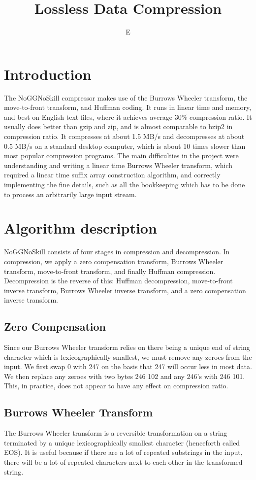 \documentclass[a4paper]{article}
\title{Lossless Data Compression}
\author{E}
\date{}
\begin{document}
\begin{multicols}{2}
\section{Introduction}
The NoGGNoSkill compressor makes use of the Burrows Wheeler transform, the move-to-front transform, and Huffman coding. It runs in linear time and memory, and best on English text files, where it achieves average 30\% compression ratio. It usually does better than gzip and zip, and is almost comparable to bzip2 in compression ratio. It compresses at about 1.5 MB/s and decompresses at about 0.5 MB/s on a standard desktop computer, which is about 10 times slower than most popular compression programs. The main difficulties in the project were understanding and writing a linear time Burrows Wheeler transform, which required a linear time suffix array construction algorithm, and correctly implementing the fine details, such as all the bookkeeping which has to be done to process an arbitrarily large input stream.

\section {Algorithm description}
NoGGNoSkill consists of four stages in compression and decompression. In compression, we apply a zero compensation transform, Burrows Wheeler transform, move-to-front transform, and finally Huffman compression. Decompression is the reverse of this: Huffman decompression, move-to-front inverse transform, Burrows Wheeler inverse transform, and a zero compensation inverse transform.
\vspace*{-.4cm}
\subsection {Zero Compensation}
Since our Burrows Wheeler transform relies on there being a unique end of string character which is lexicographically smallest, we must remove any zeroes from the input. We first swap 0 with 247 on the basis that 247 will occur less in most data. We then replace any zeroes with two bytes 246 102 and any 246's with 246 101. This, in practice, does not appear to have any effect on compression ratio.
\vspace*{-.4cm}
\subsection{Burrows Wheeler Transform}
The Burrows Wheeler transform \cite{Burrows94ablock-sorting} is a reversible transformation on a string terminated by a unique lexicographically smallest character (henceforth called EOS). It is useful because if there are a lot of repeated substrings in the input, there will be a lot of repeated characters next to each other in the transformed string.


\end{multicols}
\end{document}
